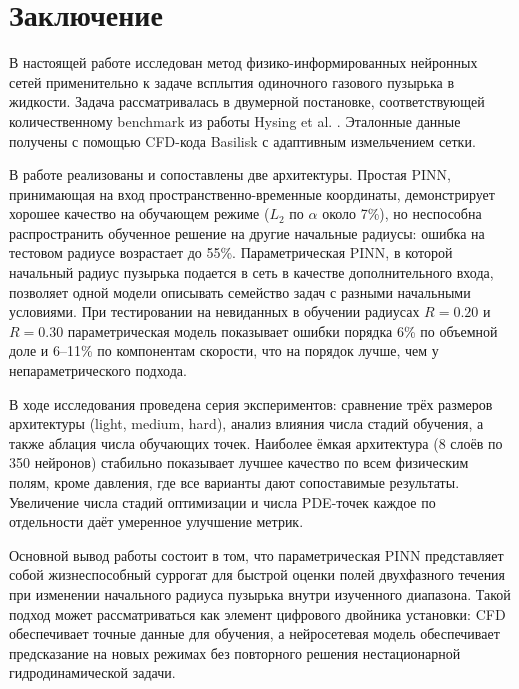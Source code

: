 \documentclass[12pt,a4paper]{article}
\begin{document}
\section{Заключение}

В настоящей работе исследован метод физико-информированных нейронных сетей
применительно к задаче всплытия одиночного газового пузырька в жидкости. Задача
рассматривалась в двумерной постановке, соответствующей количественному
benchmark из работы Hysing et al. \cite{Hysing2009}. Эталонные данные получены
с помощью CFD-кода Basilisk с адаптивным измельчением сетки.

В работе реализованы и сопоставлены две архитектуры. Простая PINN, принимающая
на вход пространственно-временные координаты, демонстрирует хорошее качество
на обучающем режиме (\(L_2\) по \(\alpha\) около 7\%), но неспособна
распространить обученное решение на другие начальные радиусы: ошибка на
тестовом радиусе возрастает до 55\%. Параметрическая PINN, в которой начальный
радиус пузырька подается в сеть в качестве дополнительного входа, позволяет
одной модели описывать семейство задач с разными начальными условиями. При
тестировании на невиданных в обучении радиусах \(R=0.20\) и \(R=0.30\)
параметрическая модель показывает ошибки порядка 6\% по объемной доле и 6--11\%
по компонентам скорости, что на порядок лучше, чем у непараметрического подхода.

В ходе исследования проведена серия экспериментов:
сравнение трёх размеров архитектуры (light, medium, hard), анализ влияния числа
стадий обучения, а также аблация числа обучающих точек. Наиболее ёмкая
архитектура (8 слоёв по 350 нейронов) стабильно показывает лучшее качество по
всем физическим полям, кроме давления, где все варианты дают сопоставимые
результаты. Увеличение числа стадий оптимизации и числа PDE-точек каждое по
отдельности даёт умеренное улучшение метрик.

Основной вывод работы состоит в том, что параметрическая PINN представляет
собой жизнеспособный суррогат для быстрой оценки полей двухфазного течения при
изменении начального радиуса пузырька внутри изученного диапазона. Такой подход
может рассматриваться как элемент цифрового двойника установки: CFD обеспечивает
точные данные для обучения, а нейросетевая модель обеспечивает предсказание
на новых режимах без повторного решения нестационарной гидродинамической задачи.
\end{document}
